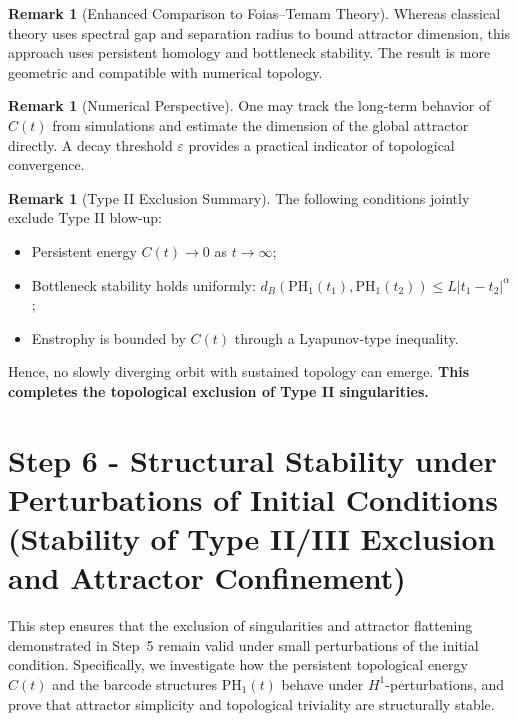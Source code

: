 \documentclass[11pt]{article}
\theoremstyle{definition}
\newtheorem{remark}[theorem]{Remark}
\begin{document}
\begin{remark}[Enhanced Comparison to Foias--Temam Theory]
Whereas classical theory uses spectral gap and separation radius to bound attractor dimension, this approach uses persistent homology and bottleneck stability. The result is more geometric and compatible with numerical topology.
\end{remark}

\begin{remark}[Numerical Perspective]
One may track the long-term behavior of $C(t)$ from simulations and estimate the dimension of the global attractor directly. A decay threshold $\varepsilon$ provides a practical indicator of topological convergence.
\end{remark}

\begin{remark}[Type II Exclusion Summary]
The following conditions jointly exclude Type II blow-up:
\begin{itemize}
  \item Persistent energy $C(t) \to 0$ as $t \to \infty$;
  \item Bottleneck stability holds uniformly: $d_B(\mathrm{PH}_1(t_1), \mathrm{PH}_1(t_2)) \le L|t_1 - t_2|^{\alpha}$;
  \item Enstrophy is bounded by $C(t)$ through a Lyapunov-type inequality.
\end{itemize}
Hence, no slowly diverging orbit with sustained topology can emerge. \textbf{This completes the topological exclusion of Type II singularities.}
\end{remark}




\section{Step 6 - Structural Stability under Perturbations of Initial Conditions\\
\small (Stability of Type II/III Exclusion and Attractor Confinement)}
\label{sec:step6}

This step ensures that the exclusion of singularities and attractor flattening demonstrated in Step~5 remain valid under small perturbations of the initial condition. Specifically, we investigate how the persistent topological energy $C(t)$ and the barcode structures $\mathrm{PH}_1(t)$ behave under $H^1$-perturbations, and prove that attractor simplicity and topological triviality are structurally stable.
\end{document}
